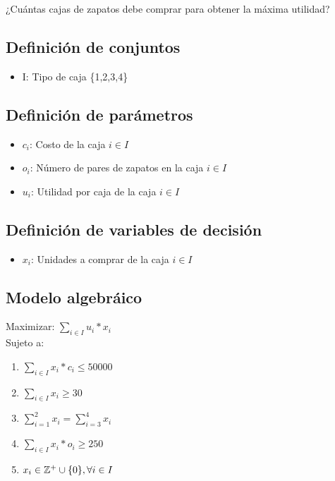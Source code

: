 \documentclass{article}
\begin{document}
¿Cuántas cajas de zapatos debe comprar para obtener la máxima utilidad?

\subsection*{Definición de conjuntos}
\begin{itemize}
    \item I: Tipo de caja \{1,2,3,4\}
\end{itemize}

\subsection*{Definición de parámetros}
\begin{itemize}
    \item $c_{i}$: Costo de la caja $i \in I$
    \item $o_{i}$: Número de pares de zapatos en la caja $i \in I$
    \item $u_{i}$: Utilidad por caja de la caja $i \in I$
\end{itemize}

\subsection*{Definición de variables de decisión}
\begin{itemize}
    \item $x_{i}$: Unidades a comprar de la caja $i \in I$
\end{itemize}

\subsection*{Modelo algebráico}

Maximizar: $\sum\limits_{i \in I} u_{i}*x_{i}$ \\
Sujeto a:
\begin{enumerate}
    \item $\sum\limits_{i \in I} x_i * c_i \leq 50000$
    \item $\sum\limits_{i \in I} x_i \geq 30$
    \item $\sum\limits_{i=1}^2 x_i = \sum\limits_{i=3}^4 x_i$
    \item $\sum\limits_{i \in I} x_i * o_i \geq 250$
    \item $x_i \in \mathbb{Z^+} \cup \{0\}, \hfill \forall i \in I$

\end{enumerate}
\end{document}

